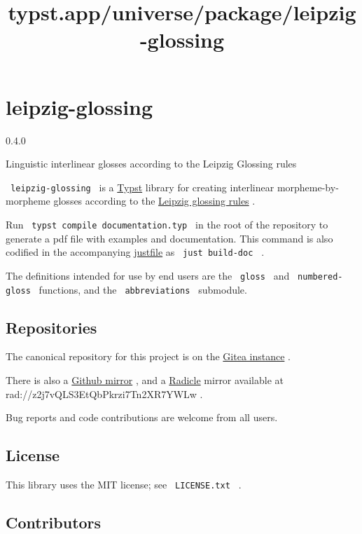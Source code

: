 \title{typst.app/universe/package/leipzig-glossing}

\label{banner}
\section{leipzig-glossing}\label{leipzig-glossing}

{ 0.4.0 }

Linguistic interlinear glosses according to the Leipzig Glossing rules

\label{readme}
\texttt{\ leipzig-glossing\ } is a
\href{https://github.com/typst/typst}{Typst} library for creating
interlinear morpheme-by-morpheme glosses according to the
\href{https://www.eva.mpg.de/lingua/pdf/Glossing-Rules.pdf}{Leipzig
glossing rules} .

Run \texttt{\ typst\ compile\ documentation.typ\ } in the root of the
repository to generate a pdf file with examples and documentation. This
command is also codified in the accompanying
\href{https://github.com/casey/just}{justfile} as
\texttt{\ just\ build-doc\ } .

The definitions intended for use by end users are the \texttt{\ gloss\ }
and \texttt{\ numbered-gloss\ } functions, and the
\texttt{\ abbreviations\ } submodule.

\subsection{Repositories}\label{repositories}

The canonical repository for this project is on the
\href{https://code.everydayimshuflin.com/greg/typst-lepizig-glossing}{Gitea
instance} .

There is also a
\href{https://github.com/neunenak/typst-leipzig-glossing/}{Github
mirror} , and a \href{https://radicle.xyz/}{Radicle} mirror available at
{rad://z2j7vQLS3EtQbPkrzi7Tn2XR7YWLw} .

Bug reports and code contributions are welcome from all users.

\subsection{License}\label{license}

This library uses the MIT license; see \texttt{\ LICENSE.txt\ } .

\subsection{Contributors}\label{contributors}

